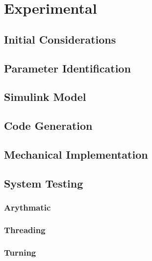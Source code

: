 \chapter{Experimental}
\label{experimental}

\section{Initial Considerations}

\section{Parameter Identification}

\section{Simulink Model}

\section{Code Generation}

\section{Mechanical Implementation}

\section{System Testing}
\subsection{Arythmatic}
\subsection{Threading}
\subsection{Turning}





